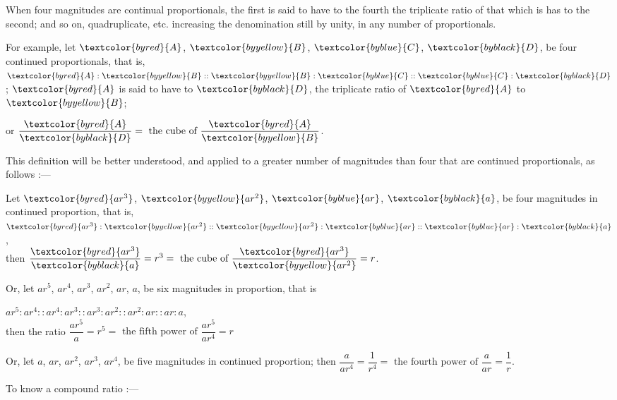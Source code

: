 \documentclass[booklanguage=english]{byrnebook}
\begin{document}
\vfill\pagebreak

\label{def:V.XI} 
\def\varA{\textcolor{byred}{A}}
\def\varB{\textcolor{byyellow}{B}}
\def\varC{\textcolor{byblue}{C}}
\def\varD{\textcolor{byblack}{D}}
\def\vararQ{\textcolor{byred}{ar^3}}
\def\vararS{\textcolor{byyellow}{ar^2}}
\def\varar{\textcolor{byblue}{ar}}
\def\vara{\textcolor{byblack}{a}}
When four magnitudes are continual proportionals, the first is said to have to the fourth the triplicate ratio of that which is has to the second; and so on, quadruplicate, etc. increasing the denomination still by unity, in any number of proportionals.

For example, let $\varA$, $\varB$, $\varC$, $\varD$, be four continued proportionals, that is, $\varA : \varB :: \varB : \varC :: \varC : \varD$; $\varA$ is said to have to $\varD$, the triplicate ratio of $\varA$ to $\varB$;

\begin{center}
or $\dfrac{\varA}{\varD} = \mbox{ the cube of } \dfrac{\varA}{\varB}$.
\end{center}

This definition will be better understood, and applied to a greater number of magnitudes than four that are continued proportionals, as follows :—

\begin{center}
Let $\vararQ$, $\vararS$, $\varar$, $\vara$, be four magnitudes in continued proportion, that is, $\vararQ : \vararS :: \vararS : \varar :: \varar : \vara$,\\
then $\dfrac{\vararQ}{\vara} = r^3 = \mbox{ the cube of } \dfrac{\vararQ}{\vararS} = r$.
\end{center}

Or, let $ar^5$, $ar^4$, $ar^3$, $ar^2$, $ar$, $a$, be six magnitudes in proportion, that is

\begin{center}
$ar^5 : ar^4 :: ar^4 : ar^3 :: ar^3 : ar^2 :: ar^2 : ar :: ar : a$,\\
then the ratio $\dfrac{ar^5}{a} = r^5 = \mbox{ the fifth power of } \dfrac{ar^5}{ar^4} = r$
\end{center}

Or, let $a$, $ar$, $ar^2$, $ar^3$, $ar^4$, be five magnitudes in continued proportion; then $\dfrac{a}{ar^4} = \dfrac{1}{r^4} = \mbox{ the fourth power of } \dfrac{a}{ar} = \dfrac{1}{r}$.

\vfill\pagebreak

\label{def:V.A}
\def\varA{\textcolor{byred}{A}}
\def\varB{\textcolor{byred}{B}}
\def\varC{\textcolor{byred}{C}}
\def\varD{\textcolor{byred}{D}}
\def\varE{\textcolor{byblue}{E}}
\def\varF{\textcolor{byblue}{F}}
\def\varG{\textcolor{byblue}{G}}
\def\varH{\textcolor{byblue}{H}}
\def\varK{\textcolor{byblue}{K}}
\def\varL{\textcolor{byblue}{L}}
\def\varM{\textcolor{byyellow}{M}}
\def\varN{\textcolor{byyellow}{N}}
To know a compound ratio :—
\end{document}
